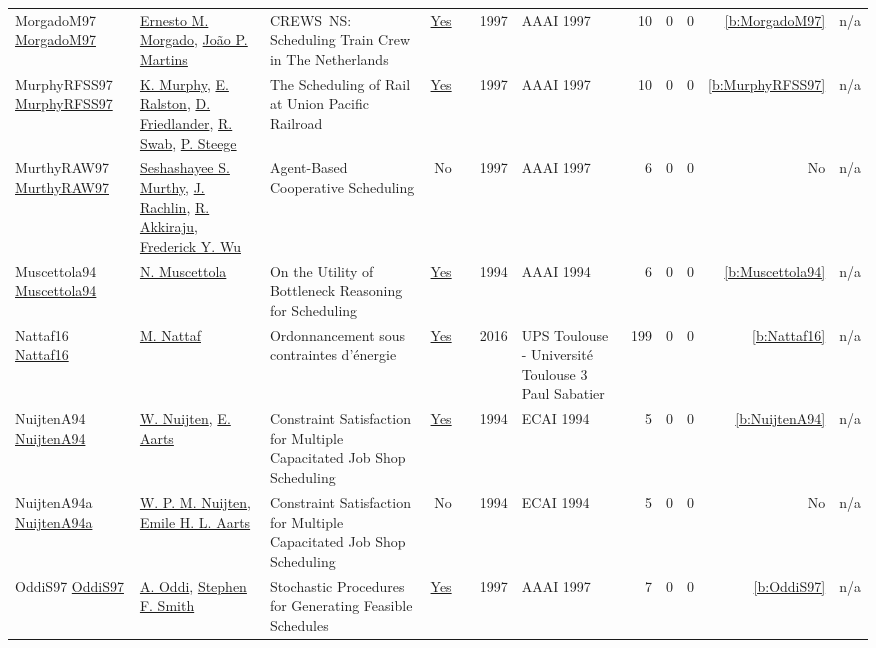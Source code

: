 {\begin{longtable}{>{\raggedright\arraybackslash}p{3cm}>{\raggedright\arraybackslash}p{6cm}>{\raggedright\arraybackslash}p{6.5cm}rrrp{2.5cm}rrrrr}
MorgadoM97 \href{http://www.aaai.org/Library/IAAI/1997/iaai97-186.php}{MorgadoM97} & \hyperref[auth:a1319]{Ernesto M. Morgado}, \hyperref[auth:a1320]{Jo{\~{a}}o P. Martins} & CREWS{\ }NS: Scheduling Train Crew in The Netherlands & \href{../works/MorgadoM97.pdf}{Yes} & \cite{MorgadoM97} & 1997 & AAAI 1997 & 10 & 0 & 0 & \ref{b:MorgadoM97} & n/a\\
MurphyRFSS97 \href{http://www.aaai.org/Library/IAAI/1997/iaai97-187.php}{MurphyRFSS97} & \hyperref[auth:a1321]{K. Murphy}, \hyperref[auth:a1322]{E. Ralston}, \hyperref[auth:a1323]{D. Friedlander}, \hyperref[auth:a1324]{R. Swab}, \hyperref[auth:a1325]{P. Steege} & The Scheduling of Rail at Union Pacific Railroad & \href{../works/MurphyRFSS97.pdf}{Yes} & \cite{MurphyRFSS97} & 1997 & AAAI 1997 & 10 & 0 & 0 & \ref{b:MurphyRFSS97} & n/a\\
MurthyRAW97 \href{}{MurthyRAW97} & \hyperref[auth:a1334]{Seshashayee S. Murthy}, \hyperref[auth:a1335]{J. Rachlin}, \hyperref[auth:a1336]{R. Akkiraju}, \hyperref[auth:a1337]{Frederick Y. Wu} & Agent-Based Cooperative Scheduling & No & \cite{MurthyRAW97} & 1997 & AAAI 1997 & 6 & 0 & 0 & No & n/a\\
Muscettola94 \href{http://www.aaai.org/Library/AAAI/1994/aaai94-170.php}{Muscettola94} & \hyperref[auth:a291]{N. Muscettola} & On the Utility of Bottleneck Reasoning for Scheduling & \href{../works/Muscettola94.pdf}{Yes} & \cite{Muscettola94} & 1994 & AAAI 1994 & 6 & 0 & 0 & \ref{b:Muscettola94} & n/a\\
Nattaf16 \href{https://laas.hal.science/tel-01417288}{Nattaf16} & \hyperref[auth:a81]{M. Nattaf} & {Ordonnancement sous contraintes d'{\'e}nergie} & \href{../works/Nattaf16.pdf}{Yes} & \cite{Nattaf16} & 2016 & {UPS Toulouse - Universit{\'e} Toulouse 3 Paul Sabatier} & 199 & 0 & 0 & \ref{b:Nattaf16} & n/a\\
NuijtenA94 \href{}{NuijtenA94} & \hyperref[auth:a662]{W. Nuijten}, \hyperref[auth:a783]{E. Aarts} & Constraint Satisfaction for Multiple Capacitated Job Shop Scheduling & \href{../works/NuijtenA94.pdf}{Yes} & \cite{NuijtenA94} & 1994 & ECAI 1994 & 5 & 0 & 0 & \ref{b:NuijtenA94} & n/a\\
NuijtenA94a \href{}{NuijtenA94a} & \hyperref[auth:a1278]{W. P. M. Nuijten}, \hyperref[auth:a1279]{Emile H. L. Aarts} & Constraint Satisfaction for Multiple Capacitated Job Shop Scheduling & No & \cite{NuijtenA94a} & 1994 & ECAI 1994 & 5 & 0 & 0 & No & n/a\\
OddiS97 \href{http://www.aaai.org/Library/AAAI/1997/aaai97-048.php}{OddiS97} & \hyperref[auth:a284]{A. Oddi}, \hyperref[auth:a300]{Stephen F. Smith} & Stochastic Procedures for Generating Feasible Schedules & \href{../works/OddiS97.pdf}{Yes} & \cite{OddiS97} & 1997 & AAAI 1997 & 7 & 0 & 0 & \ref{b:OddiS97} & n/a\\

\end{longtable}}
